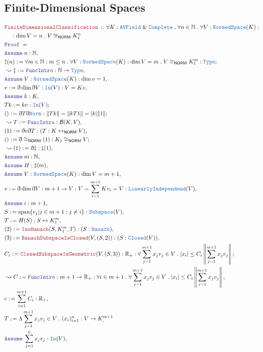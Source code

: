 \documentclass[12pt]{scrartcl}
\newcommand{\TYPE}[1]{\textcolor{NavyBlue}{\mathtt{#1}}}
\newcommand{\LOGIC}[1]{\textcolor{Blue}{\mathtt{#1}}}
\newcommand{\THM}[1]{\textcolor{Maroon}{\mathtt{#1}}}
\renewcommand{\.}{\; . \;}
\newcommand{\de}{: \kern 0.1pc =}
\newcommand{\Theorem}[2]{& \THM{#1} \, :: \, #2 \\ & \Proof = \\ }
\newcommand{\NewLine}{\\ & \kern 1pc}
\newcommand{\Page}[1]{\begin{align*} #1 \end{align*} \newpage   }
\newcommand{ \bd }{ \ByDef }
\renewcommand{\And}{\; \& \;}
\newcommand{\Reals}{\mathbb{R} }
\newcommand{\Nat}{\mathbb{N} }
\newcommand{\ToBij}{\leftrightarrow}
\newcommand{\Say}[3]{& #1 \de #2 : #3, \\}
\newcommand{\Conclude}[3]{& #1 \de #2 : #3; \\}
\newcommand{\Derive}[3]{& \leadsto #1 \de #2 : #3, \\}
\newcommand{\A}{\LOGIC{Assume} \;}
\newcommand{\Assume}[2]{& \A #1 : #2, \\}
\newcommand{\ByDef}{\eth}
\newcommand{\Proof}{\LOGIC{Proof} \; }
\newcommand{\LInd}{\TYPE{LinearlyIndependend}}
\DeclareMathOperator{\Span}{span}
\newcommand{\NS}{\TYPE{NormedSpace}}
\newcommand{\NORM}{\textsf{NORM}}
\newcommand{\B}{\mathcal{B}}
\begin{document}
\subsection{Finite-Dimensional Spaces}
\Page{
\Theorem{FiniteDimensionalClassification}
{ \forall K : \TYPE{AVField} \And \TYPE{Complete}  \.
 \forall n \in \Nat \. \forall V : \NS(K) 
 : \NewLine  
 : \dim V = n \. V \cong_\NORM K_1^n
 }
\Assume{n}{\Nat}
\Conclude{\ddag(n)}{\forall m \in \Nat : m  \le n \. \forall V : \NS(K) 
 : \dim V = m \. V \cong_\NORM K_1^m}{\TYPE{Type}}
 \Derive{\ddag}{\LOGIC{FuncIntro}}{\Nat \to \TYPE{Type}} 
\Assume{V }{ \NS(K) : \dim v = 1 }
\Say{v}{ \ByDef \dim \ByDef V }{\TYPE{In}(V) : V = Kv}
\Assume{k}{K}
\Conclude{T k}{kv}{ \TYPE{In}(V) }
\Conclude{ () }{ \ByDef  T \ByDef \TYPE{Norm} }{  \| T k \| = \| k T 1 \| = | k | \| 1 \|}
\Derive{T}{\LOGIC{FuncIntro}}{ \B(K, V)}
\Say{(1)}{\bd v \bd T}{ (T : K \ToBij_\NORM V) }
\Conclude{()}{ \bd \cong_\NORM(1)}{ K_1 \cong_\NORM V }
\Derive{(1)}{\bd \ddag}{\ddag(1)}
\Assume{m}{\Nat}
\Assume{H}{\ddag(m)}
\Assume{V}{\NS(K) : \dim V = m + 1}
\Say{v}{\bd \dim \bd V}{ m + 1 \to V : V = \sum^{m + 1}_{i = 1} Kv_i = V : \LInd(V) }
\Assume{i}{m + 1}
\Say{S}{ \Span \{ v_j | j \in  m + 1 : j \neq i \} }{\TYPE{Subspace}(V)}
\Say{T}{H(S)}{S \ToBij K^m_1}
\Say{(2)}{\THM{IsoBanach}(S, K^m_1,T)}{(S : \TYPE{Banach})}
\Say{(3)}{\THM{BanachSubspaceIsClosed}(V,(S,2))}{(S : \TYPE{Closed}(V))}
\Conclude{C_i}{ \THM{ClosedSubspaceIsGeometric}(V,(S,3))}{\Reals_+ : \forall 
\sum^{m + 1}_{j = 1} x_j v_j \in V \. |x_i| \le C_i \left\|  \sum^{m + 1}_{j = 1} x_j v_j  \right\| }
\Derive{C}{\LOGIC{FuncIntro}}{m + 1 \to \Reals_+ : \forall i \in m + 1 \. \forall \sum^{m + 1}_{j = 1} x_j v_j  \in V
 \. |x_i| \le C_i  \left\|  \sum^{m + 1}_{j = 1} x_j v_j  \right\|
}
\Say{c}{ \sum^{m + 1}_{i = 1}{C_i}}{\Reals_+}
\Say{T}{\Lambda \sum^{m + 1}_{j = 1} x_j v_j  \in V \. (x_i)^n_{i = 1}  }{V \to K^{m + 1}_}
\Assume{ \sum^n_{j = 1} x_j v_j }{ \TYPE{In}(V)}
}
\end{document}
